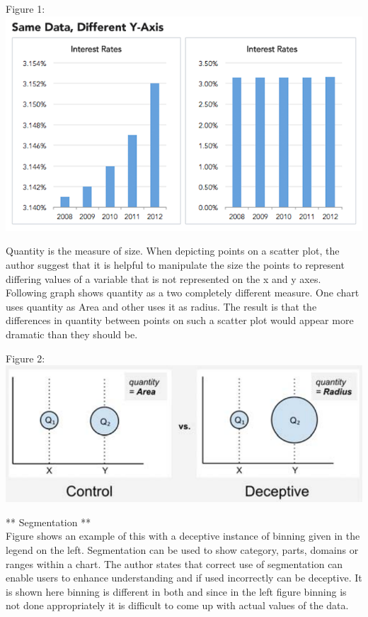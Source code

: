 \documentclass[]{book}
\theoremstyle{definition}
\theoremstyle{definition}
\theoremstyle{definition}
\theoremstyle{remark}
\begin{document}
Figure 1:\\
\includegraphics{images/Size1.png}

Quantity is the measure of size. When depicting points on a scatter
plot, the author suggest that it is helpful to manipulate the size the
points to represent differing values of a variable that is not
represented on the x and y axes. Following graph shows quantity as a two
completely different measure. One chart uses quantity as Area and other
uses it as radius. The result is that the differences in quantity
between points on such a scatter plot would appear more dramatic than
they should be.

Figure 2:\\
\includegraphics{images/Quantity1.png}

** Segmentation **\\
Figure shows an example of this with a deceptive instance of binning
given in the legend on the left. Segmentation can be used to show
category, parts, domains or ranges within a chart. The author states
that correct use of segmentation can enable users to enhance
understanding and if used incorrectly can be deceptive. It is shown here
binning is different in both and since in the left figure binning is not
done appropriately it is difficult to come up with actual values of the
data.
\end{document}
